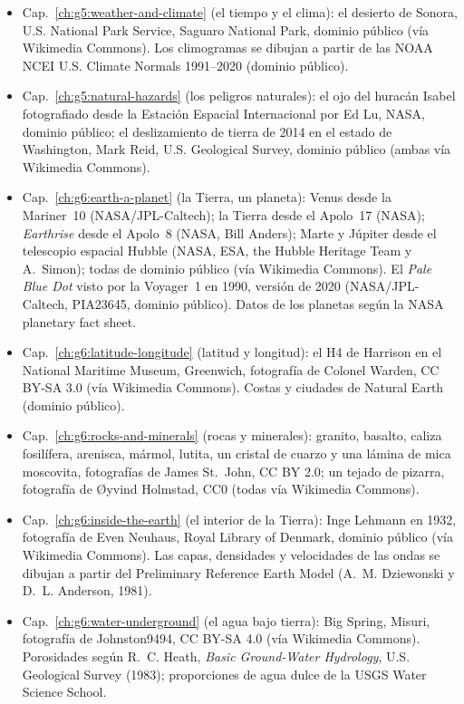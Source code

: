 \begin{itemize}
  \item Cap.~\ref{ch:g5:weather-and-climate} (el tiempo y el clima): el desierto de Sonora, U.S. National Park Service, Saguaro National Park, dominio público (vía Wikimedia Commons). Los climogramas se dibujan a partir de las NOAA NCEI U.S. Climate Normals 1991--2020 (dominio público).
  \item Cap.~\ref{ch:g5:natural-hazards} (los peligros naturales): el ojo del huracán Isabel fotografiado desde la Estación Espacial Internacional por Ed Lu, NASA, dominio público; el deslizamiento de tierra de 2014 en el estado de Washington, Mark Reid, U.S. Geological Survey, dominio público (ambas vía Wikimedia Commons).
  \item Cap.~\ref{ch:g6:earth-a-planet} (la Tierra, un planeta): Venus desde la Mariner~10 (NASA/JPL-Caltech); la Tierra desde el Apolo~17 (NASA); \emph{Earthrise} desde el Apolo~8 (NASA, Bill Anders); Marte y Júpiter desde el telescopio espacial Hubble (NASA, ESA, the Hubble Heritage Team y A.~Simon); todas de dominio público (vía Wikimedia Commons). El \emph{Pale Blue Dot} visto por la Voyager~1 en 1990, versión de 2020 (NASA/JPL-Caltech, PIA23645, dominio público). Datos de los planetas según la NASA planetary fact sheet.
  \item Cap.~\ref{ch:g6:latitude-longitude} (latitud y longitud): el H4 de Harrison en el National Maritime Museum, Greenwich, fotografía de Colonel Warden, CC BY-SA 3.0 (vía Wikimedia Commons). Costas y ciudades de Natural Earth (dominio público).
  \item Cap.~\ref{ch:g6:rocks-and-minerals} (rocas y minerales): granito, basalto, caliza fosilífera, arenisca, mármol, lutita, un cristal de cuarzo y una lámina de mica moscovita, fotografías de James St.~John, CC BY 2.0; un tejado de pizarra, fotografía de Øyvind Holmstad, CC0 (todas vía Wikimedia Commons).
  \item Cap.~\ref{ch:g6:inside-the-earth} (el interior de la Tierra): Inge Lehmann en 1932, fotografía de Even Neuhaus, Royal Library of Denmark, dominio público (vía Wikimedia Commons). Las capas, densidades y velocidades de las ondas se dibujan a partir del Preliminary Reference Earth Model (A.~M. Dziewonski y D.~L. Anderson, 1981).
  \item Cap.~\ref{ch:g6:water-underground} (el agua bajo tierra): Big Spring, Misuri, fotografía de Johnston9494, CC BY-SA 4.0 (vía Wikimedia Commons). Porosidades según R.~C. Heath, \emph{Basic Ground-Water Hydrology}, U.S. Geological Survey (1983); proporciones de agua dulce de la USGS Water Science School.

\end{itemize}
